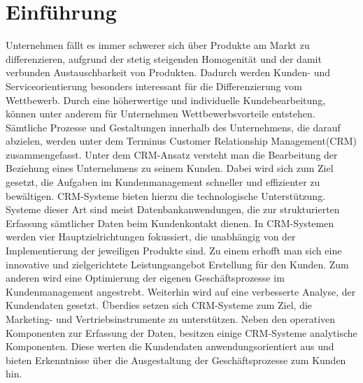 \chapter{Einführung}
\label{ch:Einfuehrung}

Unternehmen fällt es immer schwerer sich über Produkte am Markt zu differenzieren, aufgrund der stetig steigenden Homogenität und der damit verbunden Austauschbarkeit von Produkten. Dadurch werden Kunden- und Serviceorientierung besonders interessant für die Differenzierung vom Wettbewerb. Durch eine höherwertige und individuelle Kundebearbeitung, können unter anderem für Unternehmen Wettbewerbsvorteile entstehen. Sämtliche Prozesse und Gestaltungen innerhalb des Unternehmens, die darauf abzielen, werden unter dem Terminus Customer Relationship Management(CRM) zusammengefasst. Unter dem CRM-Ansatz versteht man die Bearbeitung der Beziehung eines Unternehmens zu seinem Kunden. Dabei wird sich zum Ziel gesetzt, die Aufgaben im Kundenmanagement schneller und effizienter zu bewältigen. CRM-Systeme bieten hierzu die technologische Unterstützung. Systeme dieser Art sind meist Datenbankanwendungen, die zur strukturierten Erfassung sämtlicher Daten beim Kundenkontakt dienen. In CRM-Systemen werden vier Hauptzielrichtungen fokussiert, die unabhängig von der Implementierung der jeweiligen Produkte sind. Zu einem erhofft man sich eine innovative und zielgerichtete Leistungsangebot Erstellung für den Kunden. Zum anderen wird eine Optimierung der eigenen Geschäftsprozesse im Kundenmanagement angestrebt. Weiterhin wird auf eine verbesserte Analyse, der Kundendaten gesetzt. Überdies setzen sich CRM-Systeme zum Ziel, die Marketing- und Vertriebsinstrumente zu unterstützen. Neben den operativen Komponenten zur Erfassung der Daten, besitzen einige CRM-Systeme analytische Komponenten. Diese werten die Kundendaten anwendungsorientiert aus und bieten Erkenntnisse über die Ausgestaltung der Geschäftsprozesse zum Kunden hin.

